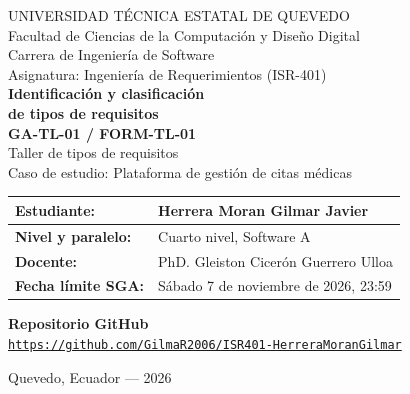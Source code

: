 \documentclass[11pt,a4paper]{article}
\begin{document}
\begin{center}
{\large UNIVERSIDAD T\'ECNICA ESTATAL DE QUEVEDO}\\[6pt]
{\normalsize Facultad de Ciencias de la Computaci\'on y Dise\~no Digital}\\[3pt]
{\normalsize Carrera de Ingenier\'ia de Software}\\[14pt]
{\normalsize Asignatura: Ingenier\'ia de Requerimientos (ISR-401)}\\[42pt]
{\LARGE\bfseries Identificaci\'on y clasificaci\'on\\[4pt] de tipos de requisitos}\\[14pt]
{\large\bfseries GA-TL-01 / FORM-TL-01}\\[14pt]
{\normalsize Taller de tipos de requisitos}\\[8pt]
{\normalsize Caso de estudio: Plataforma de gesti\'on de citas m\'edicas}
\end{center}
\vspace{1.4cm}
\begin{tabularx}{\textwidth}{|>{\bfseries}p{4.5cm}|X|}\hline
Estudiante: & Herrera Moran Gilmar Javier \\ \hline
Nivel y paralelo: & Cuarto nivel, Software A \\ \hline
Docente: & PhD. Gleiston Cicer\'on Guerrero Ulloa \\ \hline
Fecha l\'imite SGA: & S\'abado 7 de noviembre de 2026, 23:59 \\ \hline
\end{tabularx}
\vspace{1.3cm}
\begin{center}
{\bfseries Repositorio GitHub}\\[12pt]
\mbox{\href{https://github.com/GilmaR2006/ISR401-HerreraMoranGilmar}{\small\texttt{https://github.com/GilmaR2006/ISR401-HerreraMoranGilmar}}}
\end{center}
\vfill
\begin{center}
Quevedo, Ecuador --- 2026
\end{center}
\end{document}
